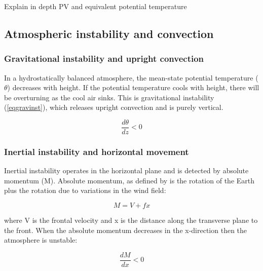 
Explain in depth PV and equivalent potential temperature\\


\subsection{Atmospheric instability and convection}

\subsubsection {Gravitational instability and upright convection}

In a hydrostatically balanced atmosphere, the mean-state potential temperature ($\theta$) decreases with height. If the potential temperature cools with height, there will be overturning as the cool air sinks. This is gravitational instability (\ref{eqgravinst}), which releases upright convection and is purely vertical.

\begin{equation} \label{eqgravinst}
\frac{d\theta}{dz} < 0
\end{equation}


\subsubsection {Inertial instability and horizontal movement}
Inertial instability operates in the horizontal plane and is detected by absolute momentum (M). Absolute momentum, as defined by \cite{eliassen1962vertical} is the rotation of the Earth plus the rotation due to variations in the wind field:

\begin{equation} \label{eqM}
M = V + fx
\end{equation}



where V is the frontal velocity and x is the distance along the transverse plane to the front. When the absolute momentum decreases in the x-direction then the atmosphere is unstable:

\begin{equation} \label{eq_iner_inst}
\frac{dM}{dx} < 0
\end{equation}


